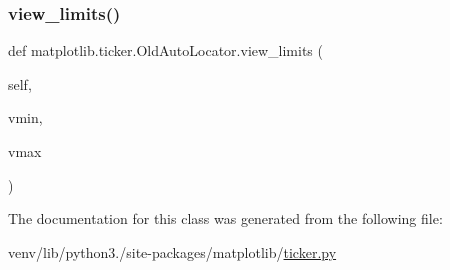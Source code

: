 \subsubsection{\texorpdfstring{view\+\_\+limits()}{view\_limits()}}
{\footnotesize\ttfamily def matplotlib.\+ticker.\+Old\+Auto\+Locator.\+view\+\_\+limits (\begin{DoxyParamCaption}\item[{}]{self,  }\item[{}]{vmin,  }\item[{}]{vmax }\end{DoxyParamCaption})}



The documentation for this class was generated from the following file\+:\begin{DoxyCompactItemize}
\item 
venv/lib/python3./site-\/packages/matplotlib/\hyperlink{ticker_8py}{ticker.\+py}\end{DoxyCompactItemize}
